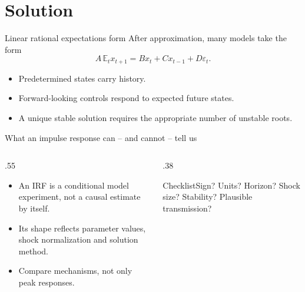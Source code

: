 \documentclass[aspectratio=169,10pt]{beamer}
\begin{document}
\section{Solution}
\begin{frame}{Linear rational expectations form}
After approximation, many models take the form \[A\,\mathbb E_t x_{t+1}=B x_t+C x_{t-1}+D\varepsilon_t.\]
\begin{itemize}\item Predetermined states carry history.\item Forward-looking controls respond to expected future states.\item A unique stable solution requires the appropriate number of unstable roots.\end{itemize}\end{frame}
\begin{frame}{What an impulse response can -- and cannot -- tell us}
\begin{columns}\begin{column}{.55\textwidth}\begin{itemize}\item An IRF is a conditional model experiment, not a causal estimate by itself.\item Its shape reflects parameter values, shock normalization and solution method.\item Compare mechanisms, not only peak responses.\end{itemize}\end{column}\begin{column}{.38\textwidth}\begin{block}{Checklist}Sign? Units? Horizon? Shock size? Stability? Plausible transmission?\end{block}\end{column}\end{columns}\end{frame}
\end{document}
